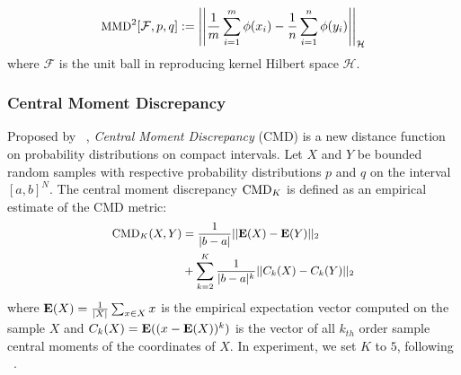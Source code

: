 

\begin{equation}
 \small
\textnormal{MMD}^2[\mathcal{F}, p, q] := \left|\left|\frac{1}{m}\sum_{i=1}^m\phi(x_i) - \frac{1}{n}\sum_{i=1}^n\phi(y_i)\right|\right|_\mathcal{H}
\end{equation}
where $\mathcal{F}$ is the unit ball in reproducing kernel Hilbert space $\mathcal{H}$.

\subsubsection{Central Moment Discrepancy}

Proposed by ~\cite{DBLP:journals/corr/ZellingerGLNS17}, {\em Central Moment Discrepancy} (CMD) is a new distance function on probability distributions on compact intervals. Let $X$ and $Y$ be bounded random samples with respective probability distributions $p$ and $q$ on the interval $[a, b]^N$. The central moment discrepancy $\textnormal{CMD}_K$ is defined as an empirical estimate of the CMD metric:
\begin{equation}
\small
\begin{aligned}
\textnormal{CMD}_K(X, Y) &= \frac{1}{|b-a|}||\textnormal{\textbf{E}}(X)-\textnormal{\textbf{E}}(Y)||_2 \\&+ \sum_{k=2}^K{\frac{1}{|b-a|^k}}||C_k(X)-C_k(Y)||_2
\end{aligned}
\end{equation}
where $\textnormal{\textbf{E}}(X) = \frac{1}{|X|}\sum_{x\in X}x$ is the empirical expectation vector computed on the sample $X$ and $C_k(X) = \textnormal{\textbf{E}}((x - \textnormal{\textbf{E}}(X))^k)$ is the vector of all $k_{th}$ order sample central moments of the coordinates of $X$. In experiment, we set $K$ to $5$, following ~\cite{DBLP:journals/corr/ZellingerGLNS17}.

